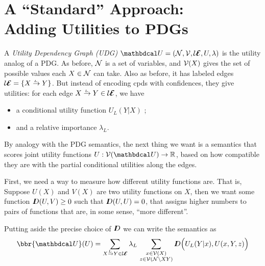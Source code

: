 \documentclass{article}
\newcommand\UEd{\mathcal U\!\!\Ed}
\begin{document}
    \section{A ``Standard'' Approach:\texorpdfstring\\{}
        Adding Utilities to PDGs}
    
    \begin{defn}
        A \emph{Utility Dependency Graph (UDG)}  $\dg U = (\N, \V, \UEd, U, \lambda)$ is the utility analog of a PDG.  As before, $\mathcal N$ is a set of variables, and $\mathcal V(X)$ gives the set of possible values each $X \in \mathcal N$ can take. 
        Also as before, it has labeled edges $\UEd = \{ \ed {L}XY \} $. But instead of encoding cpds with confidences, they give utilities: for each edge $\ed LXY \in \UEd$, we have 
        \begin{itemize}
            \item  a conditional utility function $U_L(Y|X)$%
            ;
            \item and a relative importance $\lambda_L$.  \qedhere
        \end{itemize}
    \end{defn}

    By analogy with the PDG semantics, the next thing we want is a semantics that scores joint utility functions $U : \V(\dg U) \to \mathbb R$, based on how compatible they are with the partial conditional utilities along the edges. 
    
    First, we need a way to measure how different utility functions are. That is,  Suppose $U(X)$ and $V(X)$ are two utility functions on $X$, then we want some function $I\mkern-8muD(U,V) \ge 0$ such that $I\mkern-8muD(U,U) = 0$, that assigns higher numbers to pairs of functions that are, in some sense, ``more different''.
    
    Putting aside the precise choice of $I\mkern-8muD$ we can write the semantics as 
    \begin{equation}
        \bbr{\dg U}(U) =
             \sum_{\ed LXY \in \UEd} \lambda_L\, \sum_{\substack{x \in \V(X)\\z \in \V(\N\setminus XY)}}
             \thickD\Big( U_L(Y | x),  U(x,Y,z) \Big)
    \end{equation}
\end{document}
